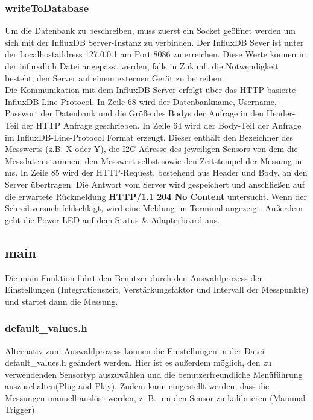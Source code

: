 \subsubsection{writeToDatabase}
Um die Datenbank zu beschreiben, muss zuerst ein Socket geöffnet werden um sich mit der InfluxDB Server-Instanz  zu verbinden.
Der InfluxDB Sever ist unter der Localhostaddress 127.0.0.1 am Port 8086 zu erreichen.
	Diese Werte können in der influxdb.h Datei angepasst werden, falls in Zukunft die Notwendigkeit besteht, den Server auf einem externen Gerät zu betreiben.\\
Die Kommunikation mit dem InfluxDB Server erfolgt über das HTTP basierte InfluxDB-Line-Protocol.
In Zeile 68 wird der Datenbankname, Username,  Passwort der Datenbank und die Größe des Bodys der Anfrage in den Header-Teil der HTTP Anfrage geschrieben.
In Zeile 64 wird der Body-Teil der Anfrage im InfluxDB-Line-Protocol Format erzeugt. Dieser enthält den Bezeichner des Messwerts (z.B. X oder Y), die I2C Adresse des jeweiligen Sensors von dem die Messdaten stammen, den Messwert selbst sowie den Zeitstempel der Messung in ms.	
In Zeile 85 wird der HTTP-Request, bestehend aus Header und Body, an den Server übertragen.
Die Antwort vom Server wird gespeichert und anschließen auf die erwartete Rückmeldung \textbf{HTTP/1.1 204 No Content } untersucht. Wenn der Schreibversuch fehlschlägt, wird eine Meldung im Terminal angezeigt.
Außerdem geht die Power-LED auf dem Status \& Adapterboard aus.
\subsection{main}\label{main}
Die main-Funktion führt den Benutzer durch den Auswahlprozess der Einstellungen (Integrationszeit, Verstärkungsfaktor und Intervall der Messpunkte) und startet dann die Messung.\\
\subsubsection{default\_values.h}
\noindent Alternativ zum Auswahlprozess können die Einstellungen in der Datei default\_values.h geändert werden. Hier ist es außerdem möglich, den zu verwendenden Sensortyp auszuwählen und die benutzerfreundliche Menüführung auszuschalten(Plug-and-Play).
Zudem kann eingestellt werden, dass die Messungen manuell auslöst werden, z. B. um den Sensor zu kalibrieren (Maunual-Trigger).\\


\newpage
